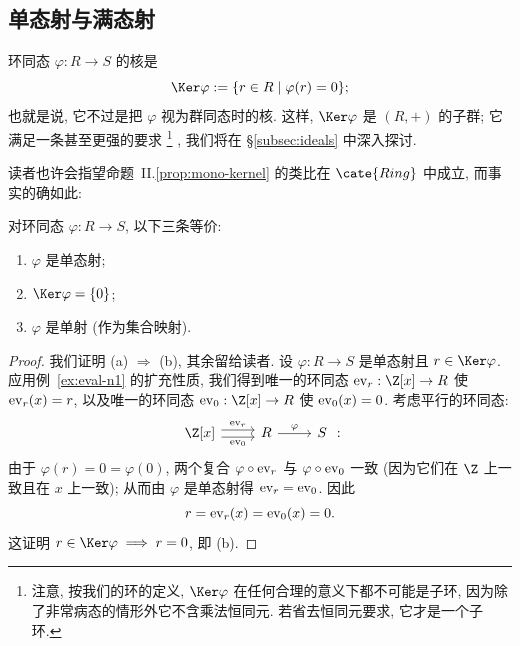 \subsection{单态射与满态射}
\label{subsec:ring-mono-epi}

环同态 $\varphi : R \to S$ 的核是
\[
\Ker \varphi := \{r \in R \mid \varphi(r) = 0\};
\]
也就是说, 它不过是把 $\varphi$ 视为群同态时的核. 这样, $\Ker \varphi$ 是 $(R, +)$ 的子群; 它满足一条甚至更强的要求%
\footnote{注意, 按我们的环的定义, $\Ker \varphi$ 在任何合理的意义下都不可能是子环, 因为除了非常病态的情形外它不含乘法恒同元. 若省去恒同元要求, 它才是一个子环.}%
, 我们将在 \S\ref{subsec:ideals} 中深入探讨.

读者也许会指望命题~II.\ref{prop:mono-kernel} 的类比在 $\cate{Ring}$ 中成立, 而事实的确如此:

\begin{proposition}
\label{prop:ring-mono}
对环同态 $\varphi : R \to S$, 以下三条等价:
\begin{enumerate}[label=(\alph*)]
	\item $\varphi$ 是单态射;
	\item $\Ker \varphi = \{0\}$;
	\item $\varphi$ 是单射 (作为集合映射).
\end{enumerate}
\end{proposition}

\begin{proof}
我们证明 (a) $\Longrightarrow$ (b), 其余留给读者. 设 $\varphi : R \to S$ 是单态射且 $r \in \Ker \varphi$. 应用例~\ref{ex:eval-n1} 的扩充性质, 我们得到唯一的环同态 $\ev_r : \Z[x] \to R$ 使 $\operatorname{ev}_r(x) = r$, 以及唯一的环同态 $\ev_0 : \Z[x] \to R$ 使 $\operatorname{ev}_0(x) = 0$. 考虑平行的环同态:
\[
\begin{tikzcd}
\Z[x] \ar[r,shift left=.6ex,"\ev_r"] \ar[r,shift right=.6ex,"\ev_0"'] & R \ar[r,"\varphi"] & S
\end{tikzcd}:
\]
由于 $\varphi(r) = 0 = \varphi(0)$, 两个复合 $\varphi \circ \operatorname{ev}_r$ 与 $\varphi \circ \operatorname{ev}_0$ 一致 (因为它们在 $\Z$ 上一致且在 $x$ 上一致); 从而由 $\varphi$ 是单态射得 $\operatorname{ev}_r = \operatorname{ev}_0$. 因此
\[
r = \operatorname{ev}_r(x) = \operatorname{ev}_0(x) = 0.
\]
这证明 $r \in \Ker \varphi \implies r = 0$, 即 (b).
\end{proof}

